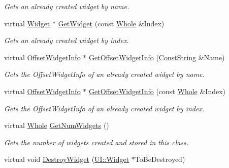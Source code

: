 \begin{DoxyCompactItemize}
\begin{DoxyCompactList}\small\item\em Gets an already created widget by name. \item\end{DoxyCompactList}\item 
virtual \hyperlink{classphys_1_1UI_1_1Widget}{Widget} $\ast$ \hyperlink{classphys_1_1UI_1_1Window_ab70e34505b0cfbdfe8fa5df9748238df}{GetWidget} (const \hyperlink{namespacephys_a460f6bc24c8dd347b05e0366ae34f34a}{Whole} \&Index)
\begin{DoxyCompactList}\small\item\em Gets an already created widget by index. \item\end{DoxyCompactList}\item 
virtual \hyperlink{structphys_1_1UI_1_1ResizingInfo}{OffsetWidgetInfo} $\ast$ \hyperlink{classphys_1_1UI_1_1Window_a77a2091e41766344253cac55af650f54}{GetOffsetWidgetInfo} (\hyperlink{namespacephys_a5ce5049f8b4bf88d6413c47b504ebb31}{ConstString} \&Name)
\begin{DoxyCompactList}\small\item\em Gets the OffsetWidgetInfo of an already created widget by name. \item\end{DoxyCompactList}\item 
virtual \hyperlink{structphys_1_1UI_1_1ResizingInfo}{OffsetWidgetInfo} $\ast$ \hyperlink{classphys_1_1UI_1_1Window_aa3691702f83c0369c4e5b1cec317e656}{GetOffsetWidgetInfo} (const \hyperlink{namespacephys_a460f6bc24c8dd347b05e0366ae34f34a}{Whole} \&Index)
\begin{DoxyCompactList}\small\item\em Gets the OffsetWidgetInfo of an already created widget by index. \item\end{DoxyCompactList}\item 
virtual \hyperlink{namespacephys_a460f6bc24c8dd347b05e0366ae34f34a}{Whole} \hyperlink{classphys_1_1UI_1_1Window_a062270984d25dca44f0bc4d65ef324a0}{GetNumWidgets} ()
\begin{DoxyCompactList}\small\item\em Gets the number of widgets created and stored in this class. \item\end{DoxyCompactList}\item 
virtual void \hyperlink{classphys_1_1UI_1_1Window_ab4bda54a82b64aec2cf4e03201a40772}{DestroyWidget} (\hyperlink{classphys_1_1UI_1_1Widget}{UI::Widget} $\ast$ToBeDestroyed)

\end{DoxyCompactItemize}
